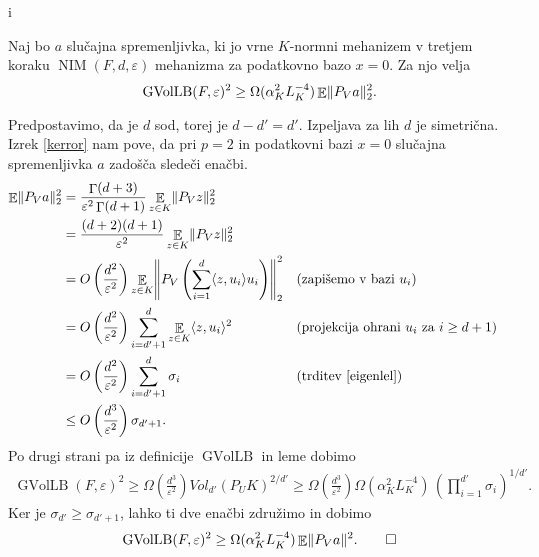 i\documentclass[mat1]{fmfdelo}
\DeclarePairedDelimiter{\norm}{\lVert}{\rVert}
\DeclarePairedDelimiter{\scalar}{\langle}{\rangle}
\DeclareMathOperator*{\E}{\mathbb E}
\DeclareMathOperator{\gfn}{\Gamma}
\DeclareMathOperator{\NIM}{NIM}
\begin{document}
\begin{lema} \label{eu}
    Naj bo $a$ slučajna spremenljivka, ki jo vrne $K$-normni mehanizem v tretjem koraku $\NIM(F,d,\varepsilon)$ mehanizma za podatkovno bazo $x=0$. Za njo velja
    \begin{equation*}
        \operatorname{GVolLB}(F,\varepsilon)^2 \geq \Omega(\alpha_K^2 L_K^{-4}) \E \norm{P_Va}_2^2.
    \end{equation*}
\end{lema}
\begin{dokaz}
    Predpostavimo, da je $d$ sod, torej je $d - d' = d'$. Izpeljava za lih $d$ je simetrična. Izrek \ref{kerror} nam pove, da pri $p=2$ in podatkovni bazi $x=0$ slučajna spremenljivka $a$ zadošča sledeči enačbi.
    \begin{align*}
        \E \norm{P_Va}^2_2 &= \frac{\gfn(d+3)}{\varepsilon^2 \gfn(d+1)} \E_{z \in K} \norm{P_Vz}^2_2 \\
        &= \frac{(d+2)(d+1)}{\varepsilon^2} \E_{z \in K} \norm{P_Vz}^2_2 \\
        &= O\left(\frac{d^2}{\varepsilon^2}\right) \E_{z \in K} \norm*{P_V\left(\sum_{i=1}^d \scalar{z, u_i}u_i\right)}^2_2  && (\text{zapišemo v bazi } u_i)\\
        &= O\left(\frac{d^2}{\varepsilon^2}\right) \sum_{i=d'+1}^d \E_{z \in K} \langle z, u_i \rangle^2  && \text{(projekcija ohrani } u_i \text{ za } i \geq d+1)\\
        &= O\left(\frac{d^2}{\varepsilon^2}\right) \sum_{i=d'+1}^d \sigma_i && \text{(trditev \ref{eigenlel})} \\
        &\leq O\left(\frac{d^3}{\varepsilon^2}\right) \sigma_{d'+1}.
    \end{align*}
    Po drugi strani pa iz definicije $\operatorname{GVolLB}$ in leme dobimo
    \begin{align*}
        \operatorname{GVolLB}(F, \varepsilon)^2 \geq \Omega\left(\frac{d^3}{\varepsilon^2}\right) Vol_{d'}(P_UK)^{2/d'} 
        \geq \Omega\left(\frac{d^3}{\varepsilon^2}\right) \Omega(\alpha_K^2 L_K^{-4}) \, \left(\prod_{i=1}^{d'} \sigma_i\right)^{1/d'}.
    \end{align*}
    Ker je $\sigma_{d'} \geq \sigma_{d'+1}$, lahko ti dve enačbi združimo in dobimo
    \begin{equation*}
        \operatorname{GVolLB}(F, \varepsilon)^2 \geq \Omega(\alpha_K^2 L_K^{-4}) \E \norm{P_Va}^2. \qedhere
    \end{equation*}
\end{dokaz}
\end{document}
